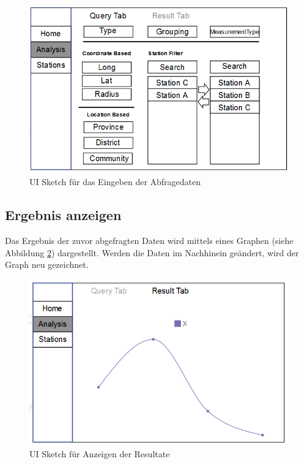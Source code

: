 \begin{figure}[H]
\centering
\includegraphics[width=1\textwidth]{pictures/sketches/cockpit/cockpit_query.png}
\caption{UI Sketch für das Eingeben der Abfragedaten}
\label{fig:cock_query}
\end{figure}
\raggedright
\newpage


\subsection{Ergebnis anzeigen}

Das Ergebnis der zuvor abgefragten Daten wird mittels eines Graphen (siehe Abbildung \ref{fig:cock_result}) dargestellt. Werden die Daten im Nachhinein geändert, wird der Graph neu gezeichnet.

\begin{figure}[H]
\centering
\includegraphics[width=1\textwidth]{pictures/sketches/cockpit/cockpit_result.png}
\caption{UI Sketch für Anzeigen der Resultate}
\label{fig:cock_result}
\end{figure}
\raggedright
\newpage

